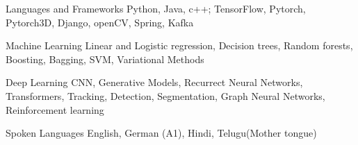 
\begin{cvskills}
    \cvskill
    {Languages and Frameworks} %
    {Python, Java, c++; TensorFlow, Pytorch, Pytorch3D, Django, openCV, Spring, Kafka} %
    
    \cvskill
    {Machine Learning} %
    {Linear and Logistic regression, Decision trees, Random forests, Boosting, Bagging, SVM, Variational Methods} %

    \cvskill
    {Deep Learning} %
    {CNN, Generative Models, Recurrect Neural Networks, Transformers, Tracking, Detection, Segmentation, \linebreak Graph Neural Networks, Reinforcement learning} %

    \cvskill
    {Spoken Languages} %
    {English, German (A1), Hindi, Telugu(Mother tongue)} %
    
\end{cvskills}
